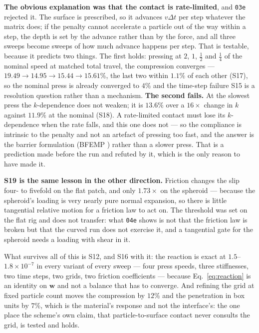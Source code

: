 \documentclass[10pt,a4paper]{article}
\newcommand{\op}[1]{\texttt{#1}}
\begin{document}
\textbf{The obvious explanation was that the contact is rate-limited}, and \op{03e} rejected it. The
surface is prescribed, so it advances $v\Delta t$ per step whatever the matrix does; if the penalty
cannot accelerate a particle out of the way within a step, the depth is set by the advance rather than
by the force, and all three sweeps become sweeps of how much advance happens per step. That is
testable, because it predicts two things. The first holds: pressing at $2$, $1$, $\tfrac12$ and
$\tfrac14$ of the nominal speed at matched total travel, the compression converges --- $19.49\to14.95
\to15.44\to15.61\%$, the last two within $1.1\%$ of each other (S17), so the nominal press is already
converged to $4\%$ and the time-step failure S15 is a resolution question rather than a mechanism.
\textbf{The second fails.} At the slowest press the $k$-dependence does not weaken; it is
$13.6\%$ over a $16\times$ change in $k$ against $11.9\%$ at the nominal (S18). A rate-limited contact
must lose its $k$-dependence when the rate falls, and this one does not --- so the compliance is
intrinsic to the penalty and not an artefact of pressing too fast, and the answer is the barrier
formulation (BFEMP \cite{li2022}) rather than a slower press. That is a prediction made before the run
and refuted by it, which is the only reason to have made it.

\textbf{S19 is the same lesson in the other direction.} Friction changes the slip four- to fivefold on
the flat patch, and only $1.73\times$ on the spheroid --- because the spheroid's loading is very nearly
pure normal expansion, so there is little tangential relative motion for a friction law to act on. The
threshold was set on the flat rig and does not transfer: what \op{04e} shows is not that the friction
law is broken but that the curved run does not exercise it, and a tangential gate for the spheroid
needs a loading with shear in it.

What survives all of this is S12, and S16 with it: the reaction is exact at $1.5$--$1.8\times10^{-7}$
in every variant of every sweep --- four press speeds, three stiffnesses, two time steps, two grids,
two friction coefficients --- because Eq.~\eqref{eq:reaction} is an identity on $\mathbf w$ and not a
balance that has to converge. And refining the grid at fixed particle count moves the compression by
$12\%$ and the penetration in box units by $7\%$, which is the material's response and not the
interface's: the one place the scheme's own claim, that particle-to-surface contact never consults the
grid, is tested and holds.
\end{document}
